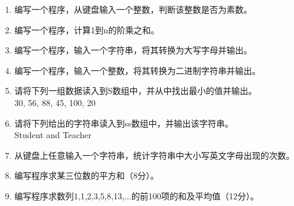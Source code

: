 \documentclass[a4paper,12pt]{article}
\begin{document}
\begin{enumerate}
	\item 编写一个程序，从键盘输入一个整数，判断该整数是否为素数。
	      \vspace{2cm}

	\item 编写一个程序，计算1到n的阶乘之和。
	      \vspace{2cm}

	\item 编写一个程序，输入一个字符串，将其转换为大写字母并输出。
	      \vspace{2cm}

	\item 编写一个程序，输入一个整数，将其转换为二进制字符串并输出。
	      \vspace{2cm}

	\item 请将下列一组数据读入到S数组中，并从中找出最小的值并输出。\\
	      30, 56, 88, 45, 100, 20
	      \vspace{2cm}

	\item 请将下列给出的字符串读入到ss数组中，并输出该字符串。\\
	      Student and Teacher
	      \vspace{2cm}

	\item 从键盘上任意输入一个字符串，统计字符串中大小写英文字母出现的次数。
	      \vspace{2cm}

	\item 编写程序求某三位数的平方和（8分）。
	      \vspace{2cm}

	\item 编写程序求数列1,1,2,3,5,8,13,...的前100项的和及平均值（12分）。
	      \vspace{2cm}
\end{enumerate}
\end{document}
